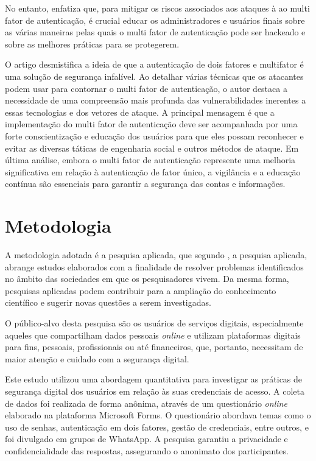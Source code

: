 \documentclass[12pt]{article}
\begin{document}
No entanto, \cite{article:3} enfatiza que, para mitigar os riscos associados aos ataques à
ao multi fator de autenticação, é crucial educar os administradores e usuários finais sobre
as várias maneiras pelas quais o multi fator de autenticação pode ser hackeado e sobre as
melhores práticas para se protegerem.

O artigo \cite{article:3} desmistifica a ideia de que a autenticação de dois fatores e
multifator é uma solução de segurança infalível.
Ao detalhar várias técnicas que os atacantes podem usar para contornar o multi fator de
autenticação, o autor destaca a necessidade de uma compreensão mais profunda das
vulnerabilidades inerentes a essas tecnologias e dos vetores de ataque.
A principal mensagem é que a implementação do multi fator de autenticação deve ser
acompanhada por uma forte conscientização e educação dos usuários para que eles possam
reconhecer e evitar as diversas táticas de engenharia social e outros métodos de ataque.
Em última análise, embora o multi fator de autenticação represente uma melhoria
significativa em relação à autenticação de fator único, a vigilância e a educação
contínua são essenciais para garantir a segurança das contas e informações.

\section{Metodologia}

A metodologia adotada é a pesquisa aplicada, que segundo \cite{book:1}, a
pesquisa aplicada, abrange estudos elaborados com a finalidade de resolver
problemas identificados no âmbito das sociedades em que os pesquisadores
vivem.
Da mesma forma, pesquisas aplicadas podem contribuir para a ampliação do
conhecimento científico e sugerir novas questões a serem investigadas.

O público-alvo desta pesquisa são os usuários de serviços digitais,
especialmente aqueles que compartilham dados pessoais \textit{online} e utilizam
plataformas digitais para fins, pessoais, profissionais ou até financeiros,
que, portanto, necessitam de maior atenção e cuidado com a segurança digital.

Este estudo utilizou uma abordagem quantitativa para investigar as práticas
de segurança digital dos usuários em relação às suas credenciais de acesso.
A coleta de dados foi realizada de forma anônima, através de um questionário
\textit{online} elaborado na plataforma Microsoft Forms.
O questionário abordava temas como o uso de senhas, autenticação em dois
fatores, gestão de credenciais, entre outros, e foi divulgado em grupos de
WhatsApp.
A pesquisa garantiu a privacidade e confidencialidade das respostas,
assegurando o anonimato dos participantes.
\end{document}
